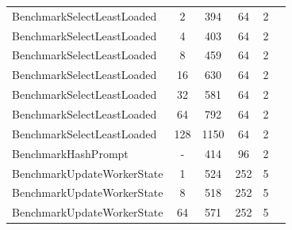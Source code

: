 \begin{table}[t]
\begin{tabular}{lccccc}
BenchmarkSelectLeastLoaded & 2 & 394 & 64 & 2 \\
BenchmarkSelectLeastLoaded & 4 & 403 & 64 & 2 \\
BenchmarkSelectLeastLoaded & 8 & 459 & 64 & 2 \\
BenchmarkSelectLeastLoaded & 16 & 630 & 64 & 2 \\
BenchmarkSelectLeastLoaded & 32 & 581 & 64 & 2 \\
BenchmarkSelectLeastLoaded & 64 & 792 & 64 & 2 \\
BenchmarkSelectLeastLoaded & 128 & 1150 & 64 & 2 \\
BenchmarkHashPrompt & - & 414 & 96 & 2 \\
BenchmarkUpdateWorkerState & 1 & 524 & 252 & 5 \\
BenchmarkUpdateWorkerState & 8 & 518 & 252 & 5 \\
BenchmarkUpdateWorkerState & 64 & 571 & 252 & 5 \\
\bottomrule
\end{tabular}
\end{table}
